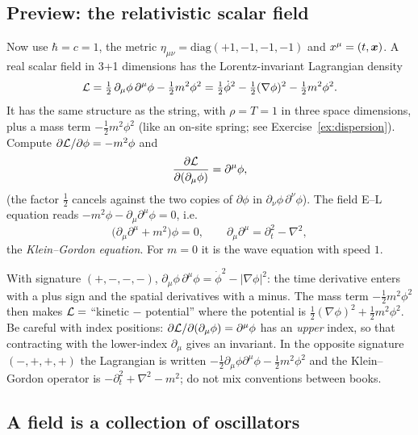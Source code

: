 \documentclass[11pt]{article}
\begin{document}
\subsection{Preview: the relativistic scalar field}

Now use $\hbar=c=1$, the metric $\eta_{\mu\nu}=\mathrm{diag}(+1,-1,-1,-1)$ and $x^\mu=(t,\bm{x})$. A real scalar field in 3+1 dimensions has the Lorentz-invariant Lagrangian density
\begin{equation}
  \mathcal{L}=\tfrac12\,\partial_\mu\phi\,\partial^\mu\phi-\tfrac12m^2\phi^2=\tfrac12\dot\phi^2-\tfrac12(\nabla\phi)^2-\tfrac12m^2\phi^2 .
\end{equation}
It has the same structure as the string, with $\rho=T=1$ in three space dimensions, plus a mass term $-\tfrac12m^2\phi^2$ (like an on-site spring; see Exercise~\ref{ex:dispersion}). Compute $\partial\mathcal{L}/\partial\phi=-m^2\phi$ and
\[
  \frac{\partial \mathcal{L}}{\partial (\partial_\mu\phi)}=\partial^\mu\phi ,
\]
(the factor $\tfrac12$ cancels against the two copies of $\partial\phi$ in $\partial_\nu\phi\,\partial^\nu\phi$). The field E--L equation reads $-m^2\phi-\partial_\mu\partial^\mu\phi=0$, i.e.
\begin{equation}
  \bigl(\partial_\mu\partial^\mu+m^2\bigr)\phi=0,\qquad \partial_\mu\partial^\mu=\partial_t^2-\nabla^2,
\end{equation}
the \emph{Klein--Gordon equation}. For $m=0$ it is the wave equation with speed $1$.

\begin{pitfall}
With signature $(+,-,-,-)$, $\partial_\mu\phi\,\partial^\mu\phi=\dot\phi^2-|\nabla\phi|^2$: the time derivative enters with a plus sign and the spatial derivatives with a minus. The mass term $-\tfrac12m^2\phi^2$ then makes $\mathcal{L}=$ ``kinetic $-$ potential'' where the potential is $\tfrac12(\nabla\phi)^2+\tfrac12m^2\phi^2$. Be careful with index positions: $\partial\mathcal{L}/\partial(\partial_\mu\phi)=\partial^\mu\phi$ has an \emph{upper} index, so that contracting with the lower-index $\partial_\mu$ gives an invariant. In the opposite signature $(-,+,+,+)$ the Lagrangian is written $-\tfrac12\partial_\mu\phi\partial^\mu\phi-\tfrac12m^2\phi^2$ and the Klein--Gordon operator is $-\partial_t^2+\nabla^2-m^2$; do not mix conventions between books.
\end{pitfall}

\subsection{A field is a collection of oscillators}
\end{document}

